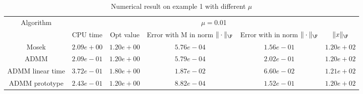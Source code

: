 \begin{table}
\centering
\begin{tabular}{|c|c|c|c|c|c|}

\hline
\multirow{2}{*}{ Algorithm} &\multicolumn{5}{c|}{$\mu=$0.01}\\\cline{2-6}
 &CPU time &Opt value &Error with M in norm $\|\cdot\|_\F$ &Error with in norm $\|\cdot\|_\F$ &$\|x\|_\F$\\\hline
Mosek & $2.09e+00$ & $1.20e+00$ & $5.76e-04$ & $1.56e-01$ & $1.20e+02$\\\hline
ADMM & $2.09e-01$ & $1.20e+00$ & $5.79e-04$ & $2.02e-01$ & $1.20e+02$\\\hline
ADMM linear time & $3.72e-01$ & $1.80e+00$ & $1.87e-02$ & $6.60e-02$ & $1.21e+02$\\\hline
ADMM prototype & $2.43e-01$ & $1.20e+00$ & $8.82e-04$ & $1.52e-01$ & $1.20e+02$\\\hline
\end{tabular}
\caption{Numerical result on example 1 with different $\mu$\label{example1}}
\end{table}
